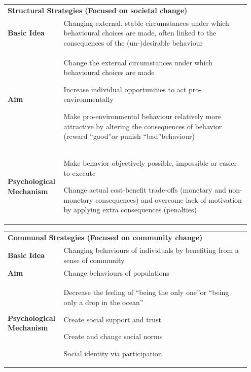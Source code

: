 \documentclass[11pt]{article}
\theoremstyle{definition}
\begin{document}
\begin{tabularx}{\linewidth}{p{0.2\linewidth} p{0.75\linewidth}}
	\multicolumn{2}{l}{\cellcolor{SteelBlue1!75} \textbf{Structural Strategies (Focused on societal change)}}\\
	\textbf{Basic Idea} & Changing external, stable circumstances under which behavioural choices are made, often linked to the consequences of the (un-)desirable behaviour \\
	\textbf{Aim} & \begin{itemize}[
		left=0pt,
		nosep,
		before={\begin{minipage}[t]{\hsize}},
			after={\end{minipage}}
		]
		\item Change the external circumstances under which behavioural choices are made
		\item Increase individual opportunities to act pro-environmentally
		\item Make pro-environmental behaviour relatively more attractive by altering the consequences of behavior (reward \textquotedblleft good\textquotedblright or punish \textquotedblleft bad\textquotedblright behaviour)
	\end{itemize} \\
	\textbf{Psychological Mechanism} & \begin{itemize}[
		left=0pt,
		nosep,
		before={\begin{minipage}[t]{\hsize}},
			after={\end{minipage}}
		]
		\item Make behavior objectively possible, impossible or easier to execute
		\item Change actual cost-benefit trade-offs (monetary and non-monetary consequences) and overcome lack of motivation by applying extra consequences (penalties)
	\end{itemize}
\end{tabularx}

\begin{tabularx}{\linewidth}{p{0.2\linewidth} p{0.75\linewidth}}
	\multicolumn{2}{l}{\cellcolor{SteelBlue1!75} \textbf{Communal Strategies (Focused on community change)}}\\
	\textbf{Basic Idea} & Changing behaviours of individuals by benefiting from a sense of community \\
	\textbf{Aim} & Change behaviours of populations \\
	\textbf{Psychological Mechanism} & \begin{itemize}[
		left=0pt,
		nosep,
		before={\begin{minipage}[t]{\hsize}},
			after={\end{minipage}}
		]
		\item Decrease the feeling of \textquotedblleft being the only one\textquotedblright or \textquotedblleft being only a drop in the ocean\textquotedblright
		\item Create social support and trust
		\item Create and change social norms
		\item Social identity via participation
	\end{itemize}
\end{tabularx}
\end{document}
